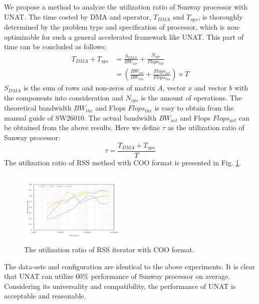 \documentclass[5p,times]{elsarticle}
\begin{document}
We propose a method to analyze the utilization ratio of Sunway processor with UNAT. The time costed by DMA and operator, $T_{DMA}$ and $T_{ops}$, is thoroughly determined by the problem type and specification of processor, which is non-optimizable for such a general accelerated framework like UNAT. This part of time can be concluded as follows:
\begin{equation}
\begin{aligned}
    T_{DMA}+T_{ops}&=\frac{S_{DMA}}{BW_{the}}+\frac{N_{ops}}{Flops_{the}} \\
    &=(\frac{BW_{act}}{BW_{the}}+\frac{Flops_{act}}{Flops_{the}})\times T
\end{aligned}
\end{equation}
$S_{DMA}$ is the sum of rows and non-zeros of matrix $A$, vector $x$ and vector $b$ with the components into consideration and $N_{ops}$ is the amount of operations. The theoretical bandwidth $BW_{the}$ and Flops $Flops_{the}$ is easy to obtain from the manual guide of SW26010. The actual bandwidth $BW_{act}$ and Flops $Flops_{act}$ can be obtained from the above results. Here we define $\tau$ as the utilization ratio of Sunway processor:
\begin{equation}
    \tau =\frac{T_{DMA}+T_{ops}}{T}
\end{equation}
The utilization ratio of RSS method with COO format is presented in Fig. \ref{tau}.
\begin{figure}[tbp]
\centerline{\includegraphics[width=0.45\textwidth]{tau.pdf}}
\caption{The utilization ratio of RSS iterator with COO format.}
\label{tau}
\end{figure}
The data-sets and configuration are identical to the above experiments. It is clear that UNAT can utilize 60\% performance of Sunway processor on average. Considering its universality and compatibility, the performance of UNAT is acceptable and reasonable.
\end{document}
